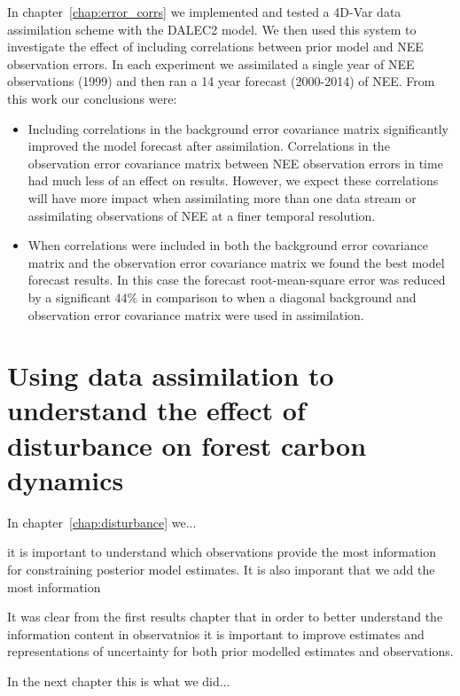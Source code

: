 In chapter~\ref{chap:error_corrs} we implemented and tested a 4D-Var data assimilation scheme with the DALEC2 model. We then used this system to investigate the effect of including correlations between prior model and NEE observation errors. In each experiment we assimilated a single year of NEE observations (1999) and then ran a 14 year forecast (2000-2014) of NEE. From this work our conclusions were:
\begin{itemize}
\item Including correlations in the background error covariance matrix significantly improved the model forecast after assimilation. Correlations in the observation error covariance matrix between NEE observation errors in time had much less of an effect on results. However, we expect these correlations will have more impact when assimilating more than one data stream or assimilating observations of NEE at a finer temporal resolution.
\item When correlations were included in both the background error covariance matrix and the observation error covariance matrix we found the best model forecast results. In this case the forecast root-mean-square error was reduced by a significant $44\% $ in comparison to when a diagonal background and observation error covariance matrix were used in assimilation.
\end{itemize} 


\section{Using data assimilation to understand the effect of disturbance on forest carbon dynamics}

In chapter~\ref{chap:disturbance} we...



 it is important to understand which observations provide the most information for constraining posterior model estimates. It is also imporant that we add the most information     


It was clear from the first results chapter that in order to better understand the information content in observatnios it is important to improve estimates and representations of uncertainty for both prior modelled estimates and observations.

In the next chapter this is what we did...